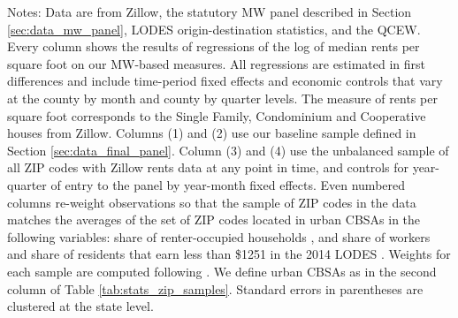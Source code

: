 \begin{table}[hbt!]
    \begin{minipage}{.95\linewidth} \footnotesize
        \vspace{2mm}
        Notes:
        Data are from Zillow,
        the statutory MW panel described in Section \ref{sec:data_mw_panel},
        LODES origin-destination statistics, and the QCEW.
        Every column shows the results of regressions of the log of
        median rents per square foot on our MW-based measures.
        All regressions are estimated in first differences and include 
        time-period fixed effects and economic controls that vary at the 
        county by month and county by quarter levels.
        The measure of rents per square foot corresponds to the Single Family, 
        Condominium and Cooperative houses from Zillow.
        Columns (1) and (2) use our baseline sample defined in Section 
        \ref{sec:data_final_panel}.
        Column (3) and (4) use the unbalanced sample of all ZIP codes with 
        Zillow rents data at any point in time, and controls for year-quarter of 
        entry to the panel by year-month fixed effects.
        Even numbered columns re-weight observations so that the sample of 
        ZIP codes in the data matches the averages of the set of ZIP codes
        located in urban CBSAs in the following variables:
        share of renter-occupied households \parencite{CensusDecennial}, and 
        share of workers and share of residents that earn less than \$1251 in
        the 2014 LODES \parencite{CensusLODES}.
        Weights for each sample are computed following \textcite{Hainmueller2012}.
        We define urban CBSAs as in the second column of Table 
        \ref{tab:stats_zip_samples}.
        Standard errors in parentheses are clustered at the state level.
    \end{minipage}
\end{table}
